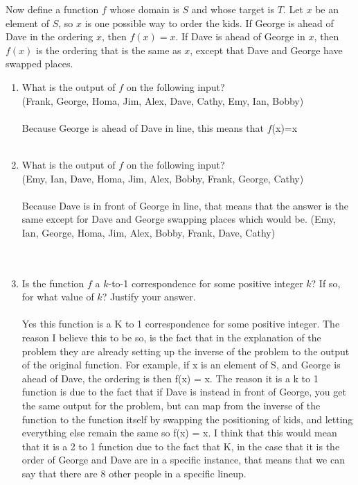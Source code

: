Now define a function $f$ whose domain is $S$ and whose target is $T$. Let $x$ be an element of $S$, so $x$ is one possible way to order the kids. If George is ahead of Dave in the ordering $x$, then $f(x) = x$. If Dave is ahead of George in $x$, then $f(x)$ is the ordering that is the same as $x$, except that Dave and George have swapped places.\\
\begin{enumerate}[label=(\alph*)]
  \item What is the output of $f$ on the following input?\\
  (Frank, George, Homa, Jim, Alex, Dave, Cathy, Emy, Ian, Bobby)\\\\
Because George is ahead of Dave in line, this means that $f$(x)=x
\\\\
  \item What is the output of $f$ on the following input?\\
(Emy, Ian, Dave, Homa, Jim, Alex, Bobby, Frank, George, Cathy)\\\\
Because Dave is in front of George in line, that means that the answer is the same except for Dave and George swapping places which would be. (Emy, Ian, George, Homa, Jim, Alex, Bobby, Frank, Dave, Cathy)
\\\\\
  \item Is the function $f$ a $k$-to-1 correspondence for some positive integer $k$? If so, for what value of $k$? Justify your answer.\\\\
Yes this function is a K to 1 correspondence for some positive integer. The reason I believe this to be so, is the fact that in the explanation of the problem they are already setting up the inverse of the problem to the output of the original function. For example, if x is an element of S, and George is ahead of Dave, the ordering is then f(x) = x. The reason it is a k to 1 function is due to the fact that if Dave is instead in front of George, you get the same output for the problem, but can map from the inverse of the function to the function itself by swapping the positioning of kids, and letting everything else remain the same so f(x) = x. I think that this would mean that it is a 2 to 1 function due to the fact that K, in the case that it is the order of George and Dave are in a specific instance, that means that we can say that there are 8 other people in a specific lineup. 

\end{enumerate}
